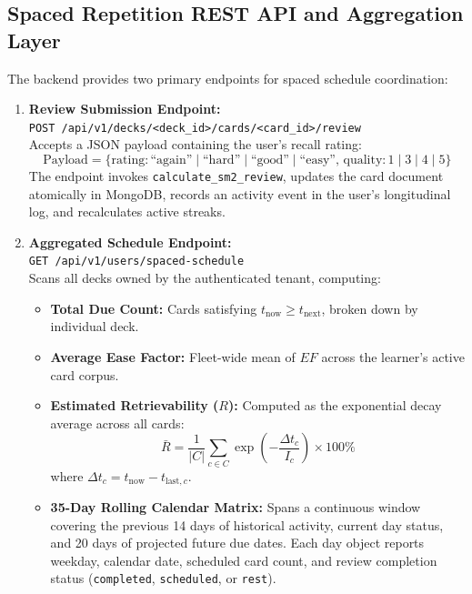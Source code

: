\documentclass[12pt,a4paper,oneside]{report}
\begin{document}
\subsection{Spaced Repetition REST API and Aggregation Layer}
The backend provides two primary endpoints for spaced schedule coordination:
\begin{enumerate}
    \item \textbf{Review Submission Endpoint:}\\
    \texttt{POST /api/v1/decks/<deck\_id>/cards/<card\_id>/review}\\
    Accepts a JSON payload containing the user's recall rating:
    \begin{equation}
        \text{Payload} = \{ \text{rating}: \text{``again''} \mid \text{``hard''} \mid \text{``good''} \mid \text{``easy''}, \, \text{quality}: 1 \mid 3 \mid 4 \mid 5 \}
    \end{equation}
    The endpoint invokes \texttt{calculate\_sm2\_review}, updates the card document atomically in MongoDB, records an activity event in the user's longitudinal log, and recalculates active streaks.
    \item \textbf{Aggregated Schedule Endpoint:}\\
    \texttt{GET /api/v1/users/spaced-schedule}\\
    Scans all decks owned by the authenticated tenant, computing:
    \begin{itemize}
        \item \textbf{Total Due Count:} Cards satisfying $t_{\text{now}} \ge t_{\text{next}}$, broken down by individual deck.
        \item \textbf{Average Ease Factor:} Fleet-wide mean of $EF$ across the learner's active card corpus.
        \item \textbf{Estimated Retrievability ($R$):} Computed as the exponential decay average across all cards:
        \begin{equation}
            \bar{R} = \frac{1}{|C|} \sum_{c \in C} \exp\left(-\frac{\Delta t_c}{I_c}\right) \times 100\%
        \end{equation}
        where $\Delta t_c = t_{\text{now}} - t_{\text{last}, c}$.
        \item \textbf{35-Day Rolling Calendar Matrix:} Spans a continuous window covering the previous 14 days of historical activity, current day status, and 20 days of projected future due dates. Each day object reports weekday, calendar date, scheduled card count, and review completion status (\texttt{completed}, \texttt{scheduled}, or \texttt{rest}).

\end{itemize}
\end{enumerate}
\end{document}
